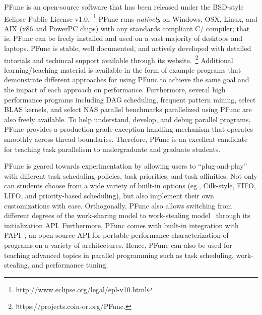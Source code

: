\documentclass[9pt,twocolumn,letter]{article}
\begin{document}
%
%
PFunc is an open-source software that has been released under the BSD-style
Eclipse Public License-v1.0.~\footnote{\texttt
http://www.eclipse.org/legal/epl-v10.html}
%
PFunc runs \textit{natively} on Windows, OSX, Linux, and AIX (x86 and
PowerPC chips) with any standards compliant C/\Cpp{} compiler; that is, PFunc
can be freely installed and used on a vast majority of desktops and
laptops.
%
PFunc is stable, well documented, and actively developed with detailed
tutorials and techincal support available through its
website.~\footnote{\texttt https://projects.coin-or.org/PFunc.}
%
Additional learning/teaching material is available in the form of example
programs that demonstrate different approaches for using PFunc to achieve the
same goal and the impact of each approach on performance.
%
Furthermore, several high performance programs including DAG scheduling,
frequent pattern mining, select BLAS kernels, and select NAS parallel
benchmarks parallelized using PFunc are also freely available.
%
To help understand, develop, and debug parallel programs, PFunc provides a
production-grade exception handling mechanism that operates smoothly across
thread boundaries.
%
Therefore, PFunc is an excellent candidate for teaching task parallelism to 
undergraduate and graduate students.

%
%
PFunc is geared towards experimentation by allowing users to ``plug-and-play''
with different task scheduling policies, task priorities, and task affinities.
%
Not only can students choose from a wide variety of built-in options (eg.,
Cilk-style, FIFO, LIFO, and priority-based scheduling), but also implement
their own customizations with ease.
%
Orthogonally, PFunc also allows switching from different degrees of the
work-sharing model to work-stealing model~\cite{Blumofe94} through its
initialization API.
%
Furthermore, PFunc comes with built-in integration with PAPI~\cite{papi}, an
open-source API for portable performance characterization of programs on a
variety of architectures. 
%
Hence, PFunc can also be used for teaching advanced topics in parallel
programming such as task scheduling, work-stealing, and performance tuning. 

%
%
\end{document}
